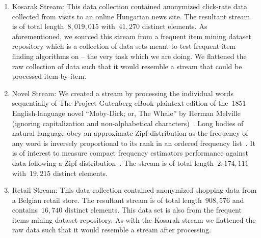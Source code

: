 \begin{enumerate}

    \item Kosarak Stream: This data collection contained anonymized click-rate data collected from visits to an online Hungarian news site. The resultant stream is of total length~$8,019,015$ with~$41,270$ distinct elements. As aforementioned, we sourced this stream from a frequent item mining dataset repository which is a collection of data sets meant to test frequent item finding algorithms on -- the very task which we are doing. We flattened the raw collection of data such that it would resemble a stream that could be processed item-by-item.

    \item Novel Stream: We created a stream by processing the individual words sequentially of The Project Gutenberg eBook plaintext edition of the~$1851$ English-language novel ``Moby-Dick; or, The Whale'' by Herman Melville (ignoring capitalization and non-alphabetical characters)~\cite{melville1851}. %
    Long bodies of natural language obey an approximate Zipf distribution as the frequency of any word is inversely proportional to its rank in an ordered frequency list~\cite{adamic2002zipf}.  It is of interest to measure compact frequency estimators performance against data following a Zipf distribution~\cite{charikar2002finding,cormode2005s,yang2019heavykeeper,radu2010,metwally2006,manku2002approximate}. The stream is of total length~$2,174,111$ with~$19,215$ distinct elements.
 
    \item Retail Stream: This data collection contained anonymized shopping data from a Belgian retail store. The resultant stream is of total length~$908,576$ and contains~$16,740$ distinct elements. This data set is also from the frequent items mining dataset repository. As with the Kosarak stream we flattened the raw data such that it would resemble a stream after processing. 
\end{enumerate}

